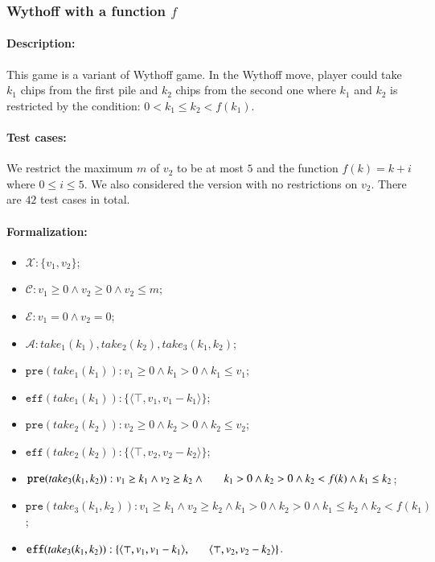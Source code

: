 \documentclass[review]{elsarticle}
\newcommand{\set}[1]{\{ #1 \}}
\newcommand{\tuple}[1]{\langle {#1} \rangle}
\newcommand{\true}{\top}
\newcommand{\statevar}{\mathcal{X}}
\newcommand{\act}{\mathcal{A}}
\newcommand{\constraint}{\mathcal{C}}
\newcommand{\estate}{\mathcal{E}}
\newcommand{\pre}{\mathtt{pre}}
\newcommand{\eff}{\mathtt{eff}}
\begin{document}
\subsubsection{Wythoff with a function $f$ \protect\cite{LiuZ2015}}

\paragraph{Description:}
This game is a variant of Wythoff game. 
In the Wythoff move, player could take $k_1$ chips from the first pile and $k_2$ chips from the second one where $k_1$ and $k_2$ is restricted by the condition: $0 < k_1 \le k_2 <f(k_1)$.
\paragraph{Test cases:}
We restrict the maximum $m$ of $v_2$ to be at most $5$ and the function $f(k) = k + i$ where $0 \leq i \leq 5$.
We also considered the version with no restrictions on $v_2$.
There are $42$ test cases in total.
\paragraph{Formalization:}
\begin{itemize}
	\item $\statevar: \set{v_1, v_2}$;
	\item $\constraint: v_1 \ge 0 \wedge v_2 \ge 0 \wedge v_2 \le m$;
	\item $\estate: v_1=0 \wedge v_2 = 0$;
	\item $\act:take_1(k_1), take_2(k_2), take_3(k_1,k_2)$;
	\item $\pre(take_1(k_1)) : v_1 \ge 0 \wedge k_1 > 0 \wedge k_1 \le v_1$;
	\item $\eff(take_1(k_1)) : \set{\tuple{\true, v_1, v_1-k_1}}$;
	\item $\pre(take_2(k_2)) : v_2 \ge 0 \wedge k_2 > 0 \wedge k_2 \le v_2$;
	\item $\eff(take_2(k_2)) : \set{\tuple{\true, v_2, v_2-k_2}}$;
	\item $\pre(take_3(k_1, k_2)) : v_1 \ge k_1 \wedge v_2 \ge k_2 \wedge \\ \hspace*{6mm}
	k_1 > 0 \wedge k_2 > 0\wedge k_2 < f(k) \wedge k_1 \le k_2$;
	\item {\color{red}$\pre(take_3(k_1, k_2)) : v_1 \ge k_1 \wedge v_2 \ge k_2 \wedge k_1 > 0 \wedge k_2 > 0 \wedge k_1 \le k_2 \wedge k_2 < f(k_1)$;}
	\item $\eff(take_3(k_1, k_2)) : \set{\tuple{\true, v_1, v_1 -k_1},\\ \hspace*{6mm}
		\tuple{\true, v_2, v_2 - k_2}}$.
\end{itemize}
\end{document}

